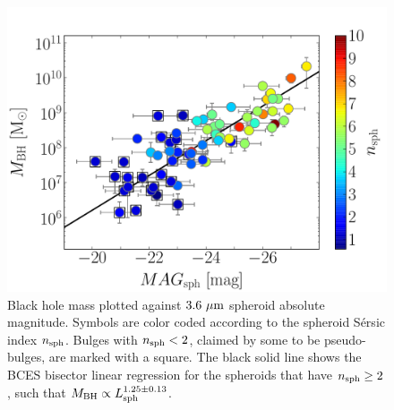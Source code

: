 \documentclass[preprint2]{emulateapj}
\begin{document}
\begin{figure}[h]
\begin{center}
\includegraphics[width=\columnwidth]{images/mbh_vs_mag_sph_psb.pdf}
\caption{Black hole mass plotted against $3.6\rm~\mu m$ spheroid absolute magnitude. 
Symbols are color coded according to the spheroid S\'ersic index $n_{\rm sph}$. 
Bulges with $n_{\rm sph}<2$, claimed by some to be pseudo-bulges, are marked with a square. 
The black solid line shows the BCES bisector linear regression for the spheroids that have $n_{\rm sph} \geq 2$, 
such that $M_{\rm BH} \propto L_{\rm sph}^{1.25 \pm 0.13}$. }
\label{fig:pseudob}
\end{center}
\end{figure}
\end{document}
